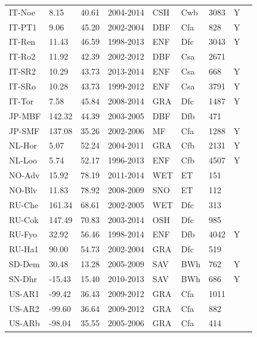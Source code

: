 \documentclass{myreport}
\begin{document}
\begin{longtable}{lllllllll}
  IT-Noe & 8.15 & 40.61 & 2004-2014 & CSH & Cwb & 3083 & Y & \cite{IT-Noe} \\ 
  IT-PT1 & 9.06 & 45.20 & 2002-2004 & DBF & Cfa & 828 & Y & \cite{IT-PT1} \\ 
  IT-Ren & 11.43 & 46.59 & 1998-2013 & ENF & Dfc & 3043 & Y & \cite{IT-Ren} \\ 
  IT-Ro2 & 11.92 & 42.39 & 2002-2012 & DBF & Csa & 2671 &  & \cite{IT-Ro2} \\ 
  IT-SR2 & 10.29 & 43.73 & 2013-2014 & ENF & Csa & 668 & Y & \cite{IT-SR2} \\ 
  IT-SRo & 10.28 & 43.73 & 1999-2012 & ENF & Csa & 3791 & Y & \cite{IT-SRo} \\ 
  IT-Tor & 7.58 & 45.84 & 2008-2014 & GRA & Dfc & 1487 & Y & \cite{IT-Tor} \\ 
  JP-MBF & 142.32 & 44.39 & 2003-2005 & DBF & Dfb & 471 &  & \cite{JP-MBF} \\ 
  JP-SMF & 137.08 & 35.26 & 2002-2006 & MF & Cfa & 1288 & Y & \cite{JP-SMF} \\ 
  NL-Hor & 5.07 & 52.24 & 2004-2011 & GRA & Cfb & 2131 & Y & \cite{NL-Hor} \\ 
  NL-Loo & 5.74 & 52.17 & 1996-2013 & ENF & Cfb & 4507 & Y & \cite{NL-Loo} \\ 
  NO-Adv & 15.92 & 78.19 & 2011-2014 & WET & ET & 151 &  & \cite{NO-Adv} \\ 
  NO-Blv & 11.83 & 78.92 & 2008-2009 & SNO & ET & 112 &  & \cite{NO-Blv} \\ 
  RU-Che & 161.34 & 68.61 & 2002-2005 & WET & Dfc & 313 &  & \cite{RU-Che} \\ 
  RU-Cok & 147.49 & 70.83 & 2003-2014 & OSH & Dfc & 985 &  & \cite{RU-Cok} \\ 
  RU-Fyo & 32.92 & 56.46 & 1998-2014 & ENF & Dfb & 4042 & Y & \cite{RU-Fyo} \\ 
  RU-Ha1 & 90.00 & 54.73 & 2002-2004 & GRA & Dfc & 519 &  & \cite{RU-Ha1} \\ 
  SD-Dem & 30.48 & 13.28 & 2005-2009 & SAV & BWh & 762 & Y & \cite{SD-Dem} \\ 
  SN-Dhr & -15.43 & 15.40 & 2010-2013 & SAV & BWh & 686 & Y & \cite{SN-Dhr} \\ 
  US-AR1 & -99.42 & 36.43 & 2009-2012 & GRA & Cfa & 1011 &  & \cite{US-AR1} \\ 
  US-AR2 & -99.60 & 36.64 & 2009-2012 & GRA & Cfa & 882 &  & \cite{US-AR2} \\ 
  US-ARb & -98.04 & 35.55 & 2005-2006 & GRA & Cfa & 414 &  & \cite{US-ARb} \\ 

\end{longtable}
\end{document}
